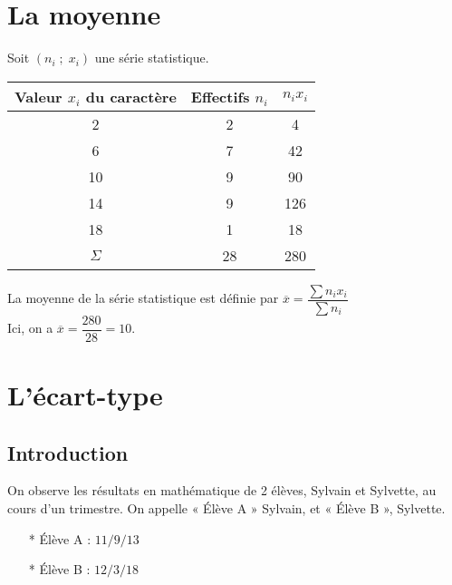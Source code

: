 \vspace*{-.8cm}

\section{La moyenne}

Soit $\left(n_i \;  ;\; x_i\right)$ une série statistique. \\

\begin{tabular}{c|c|c}
Valeur $x_i$ du caractère & Effectifs $n_i$ & $n_ix_i$ \\
\hline
2 & 2 & 4 \\
6 & 7 & 42 \\
10 & 9 & 90 \\
14 & 9 & 126 \\
18 & 1 & 18 \\
\hline
$\Sigma$ & 28 & 280 \\
\end{tabular}

\vspace*{.3cm}

La moyenne de la série statistique est définie par $\overline{x} = \dfrac{\displaystyle{\sum n_ix_i}}{\displaystyle{\sum n_i}}$ \\

Ici, on a $\overline{x} = \dfrac{280}{28} = 10$. 

\vspace*{-5cm}

\newpage

\section{L'écart-type}

\subsection{Introduction}

On observe les résultats en mathématique de 2 élèves, Sylvain et Sylvette, au cours d'un trimestre. On appelle « Élève A » Sylvain, et « Élève B », Sylvette. \\

\begin{itemize}
\item[*] Élève A : $ 11 / 9 / 13 $
\item[*] Élève B : $ 12 / 3 / 18 $
\end{itemize}

